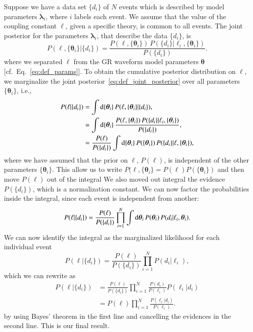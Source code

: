 \documentclass[twocolumn,
               prd,
               aps,
               superscriptaddress,
               tightenlines,
               nofootinbib,
               eqsecnum,
               amsfonts,
               amsmath,
               longbibliography]{revtex4-1}
\newcommand{\btheta}{\bm{\theta}}
\newcommand{\dd}{{\rm d}}
\begin{document}
Suppose we have a data set $\{d_{i}\}$ of $N$ events which is described by
model parameters $\bm{\lambda}_{i}$, where $i$ labels each event.
%
We assume that the value of the coupling constant $\ell$, given a specific theory,
is common to all events.
%
%
The joint posterior for the parameters $\bm{\lambda}_{i}$, that describe the
data $\{d_{i}\}$, is
%
\begin{equation}
P(\ell, \{\btheta_i\} | \{d_{i}\})
= \frac{ P(\ell, \{\btheta_i\}) \, P( \{d_i\} | \ell_i, \{\btheta_i\} ) }{ P(\{d_i\}) }.
\label{eq:def_joint_posterior}
\end{equation}
%
where we separated $\ell$ from the GR waveform model parameters $\btheta$ [cf.~Eq.~\eqref{eq:def_params}].
%
%
To obtain the cumulative posterior distribution on $\ell$, we marginalize
the joint posterior~\eqref{eq:def_joint_posterior} over
all parameters $\{ \btheta_i \}$, i.e.,
%
\begin{align}
P(\ell | \{d_i\}) &= \int \dd \{\btheta_i\} \, P(\ell, \{\btheta_i\} | \{d_{i}\}),
\nonumber \\
                  &= \int \dd \{\btheta_i\} \, \frac{ P(\ell, \{\btheta_i\}) \, P( \{d_i\} | \ell_i, \{\btheta_i\} ) }{ P(\{d_i\}) },
\nonumber \\
                  &= \frac{P(\ell)}{P(\{d_i\})} \int \dd \{\btheta_i\} \, P(\{\btheta_i\}) \, P( \{d_i\} | \ell, \{\btheta_i\} ),
\end{align}
%
where we have assumed that the prior on $\ell$, $P(\ell)$, is independent of
the other parameters $\{\btheta_i\}$.
%
This allow us to write $P(\ell, \{\btheta_i\} = P(\ell) P(\{\btheta_i\})$
and then move $P(\ell)$ out of the integral
%
We also moved out integral the evidence $P(\{d_i\})$, which is a normalization constant.
%
%
We can now factor the probabilities inside the integral, since each event is independent from another:
%
\begin{equation}
P(\ell | \{d_i\}) = \frac{P(\ell)}{P(\{d_i\})}
\prod_{i=1}^{N}
\int \dd \btheta_i \, P(\btheta_i) \, P( d_i | \ell_i, \btheta_i ).
\end{equation}
%
We can now identify the integral as the marginalized likelihood for each individual event
%
\begin{equation}
P(\ell | \{d_i\}) = \frac{P(\ell)}{P(\{d_i\})}
\prod_{i=1}^{N} P( d_i | \ell_i ),
\end{equation}
%
which we can rewrite as
%
\begin{align}
P(\ell | \{d_i\}) &= \frac{P(\ell)}{P(\{d_i\})}
\prod_{i=1}^{N} \frac{P(d_i)}{P(\ell_i)} P(\ell_i | d_i)
\nonumber \\
&= P(\ell)
\prod_{i=1}^{N} \frac{P(\ell_i | d_i)}{P(\ell_i)}.
\label{eq:cumulative_dist_ell}
\end{align}
%
by using Bayes' theorem in the first line and cancelling the evidences in the
second line. This is our final result.
\end{document}
